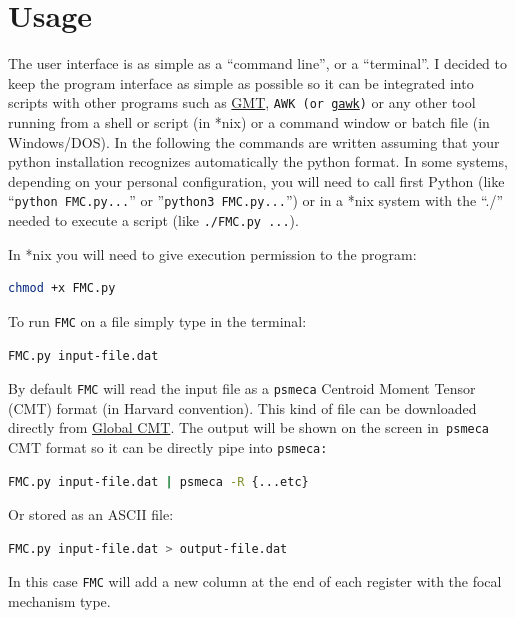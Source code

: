 \documentclass[11pt,a4paper,english]{article}
\numberwithin{equation}{section}
\begin{document}
\section{Usage}

The user interface is as simple as a ``command line'', or a ``terminal''.
I decided to keep the program interface as simple as possible so it can be integrated
into scripts with other programs such as \href{http://www.soest.hawaii.edu/gmt5/}{GMT},
\texttt{AWK (or \href{http://www.gnu.org/software/gawk/}{gawk})}
or any other tool running from a shell or script (in *nix) or a
command window or batch file (in Windows/DOS). In the following the
commands are written assuming that your python installation recognizes
automatically the python format. In some systems, depending on your
personal configuration, you will need to call first Python (like ``\texttt{python
FMC.py...}'' or ''\texttt{python3 FMC.py...}'') or in a *nix
system with the ``./'' needed to execute a script (like \texttt{./FMC.py
...}).

In *nix you will need to give execution permission to the program:

\begin{lstlisting}[language=bash]
chmod +x FMC.py
\end{lstlisting}

To run \texttt{FMC} on a file simply type in the terminal:

\begin{lstlisting}[language=bash]
FMC.py input-file.dat
\end{lstlisting}

By default \texttt{FMC} will read the input file as a \texttt{psmeca}
Centroid Moment Tensor (CMT) format (in Harvard convention). This
kind of file can be downloaded directly from \href{http://www.globalcmt.org/}{Global CMT}.
The output will be shown on the screen in\texttt{ psmeca} CMT format
so it can be directly pipe into \texttt{psmeca:}

\begin{lstlisting}[language=bash]
FMC.py input-file.dat | psmeca -R {...etc}
\end{lstlisting}

Or stored as an ASCII file:

\begin{lstlisting}[language=bash]
FMC.py input-file.dat > output-file.dat
\end{lstlisting}

In this case \texttt{FMC} will add a new column at the end of each
register with the focal mechanism type.
\end{document}
